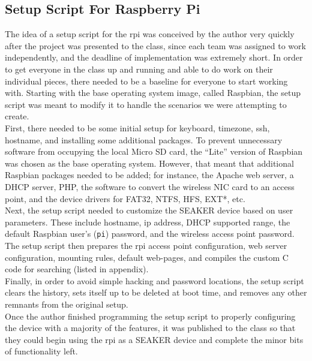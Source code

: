 \documentclass[12pt]{article}
\begin{document}
\subsection{Setup Script For Raspberry Pi}

The idea of a setup script for the \gls{rpi} was conceived by the author 
very quickly after the project was presented to the class, since
each team was assigned to work independently, and the deadline of implementation was
extremely short.  In order to get everyone in
the class up and running and able to do work on their individual pieces, there
needed to be a baseline for everyone to start working with.  Starting with the 
base operating system image, called Raspbian, the setup script was meant to modify
it to handle the scenarios we were attempting to create.\\

First, there needed to be some initial setup for keyboard, timezone, \gls{ssh}, hostname,
and installing some additional packages.  To prevent unnecessary 
software from occupying the local Micro SD card, the ``Lite'' version of Raspbian
was chosen as the base operating system.  However, that meant that additional
Raspbian packages needed to be added; for instance, the Apache web server, a DHCP
server, PHP, the software to convert the wireless NIC card to an access point, and
the device drivers for FAT32, NTFS, HFS, EXT*, etc.\\

Next, the setup script needed to customize the SEAKER device based on user
parameters.  These include hostname, \gls{ip} address, DHCP supported range, the
default Raspbian user's (\verb|pi|) password, and the wireless access point password.\\

The setup script then prepares the \gls{rpi} access point configuration, web server
configuration, mounting rules, default web-pages, and compiles the custom C code
for searching (listed in appendix).\\

Finally, in order to avoid simple hacking and password locations, the setup
script clears the history, sets itself up to be deleted at boot time, and removes
any other remnants from the original setup.\\

Once the author finished programming the setup script to properly configuring the
device with a majority of the features, it was published to the class so that they could
begin using the \gls{rpi} as a SEAKER device and complete the minor bits of
functionality left.\\
\end{document}
